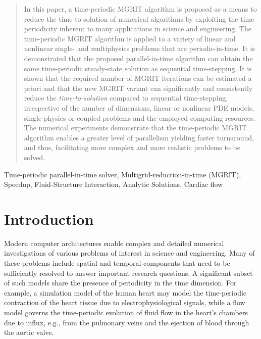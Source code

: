 \documentclass[3p]{elsarticle}
\begin{document}
\begin{frontmatter}
\begin{abstract}
    In this paper, a time-periodic MGRIT algorithm is proposed
    as a means to reduce the time-to-solution of numerical algorithms
    by exploiting the time periodicity inherent to many applications
    in science and engineering.
    The time-periodic MGRIT algorithm is applied
    to a variety of linear and nonlinear single- and multiphysics problems that are periodic-in-time.
    It is demonstrated that the proposed parallel-in-time algorithm
    can obtain the same time-periodic steady-state solution as sequential time-stepping.
    It is shown that the required number of MGRIT iterations
    can be estimated a priori and that the new MGRIT variant can significantly and consistently reduce
    the \emph{time-to-solution} compared to sequential time-stepping,
    irrespective of the number of dimensions, linear or nonlinear PDE models,
    single-physics or coupled problems and the employed computing resources.
    The numerical experiments demonstrate that the time-periodic MGRIT algorithm
    enables a greater level of parallelism yielding faster turnaround,
    and thus, facilitating more complex and more realistic problems to be solved.
\end{abstract}

\begin{keyword}
Time-periodic parallel-in-time solver,
Multigrid-reduction-in-time (MGRIT),
Speedup,
Fluid-Structure Interaction,
Analytic Solutions,
Cardiac flow
\end{keyword}

\end{frontmatter}
\newif\iffigure
\figuretrue

\section{Introduction}\label{introduction-sec}
Modern computer architectures enable complex and detailed numerical investigations
of various problems of interest in science and engineering.
Many of these problems include spatial and temporal components
that need to be sufficiently resolved to answer important research questions.
A significant subset of such models share the presence of periodicity in the time dimension.
For example, a simulation model of the human heart may model the time-periodic contraction
of the heart tissue due to electrophysiological signals, while a flow model governs
the time-periodic evolution of fluid flow in the heart's chambers
due to influx, e.g., from the pulmonary veins
and the ejection of blood through the aortic valve.
\end{document}
